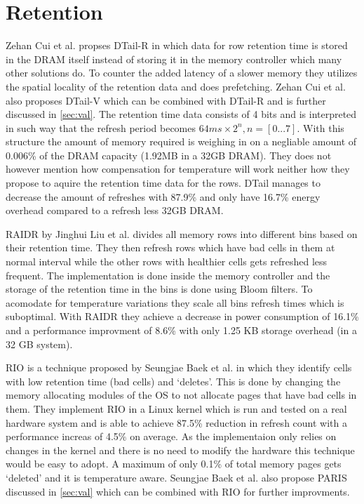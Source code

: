 \section{Retention}
\label{sec:ret}

Zehan Cui et al. \cite{dtail} propses DTail-R in which data for row retention time is stored in the DRAM itself instead of storing it in the memory controller which many other solutions do. To counter the added latency of a slower memory they utilizes the spatial locality of the retention data and does prefetching. Zehan Cui et al. also proposes DTail-V which can be combined with DTail-R and is further discussed in \ref{sec:val}. The retention time data consists of 4 bits and is interpreted in such way that the refresh period becomes \(64ms \times 2^n, n = [0...7]\). With this structure the amount of memory required is weighing in on a negliable amount of 0.006\% of the DRAM capacity (1.92MB in a 32GB DRAM). They does not however mention how compensation for temperature will work neither how they propose to aquire the retention time data for the rows. DTail manages to decrease the amount of refreshes with 87.9\% and only have 16.7\% energy overhead compared to a refresh less 32GB DRAM.

RAIDR by Jinghui Liu et al. \cite{raidr} divides all memory rows into different bins based on their retention time. They then refresh rows which have bad cells in them at normal interval while the other rows with healthier cells gets refreshed less frequent. The implementation is done inside the memory controller and the storage of the retention time in the bins is done using Bloom filters. To acomodate for temperature variations they scale all bins refresh times which is suboptimal. With RAIDR they achieve a decrease in power consumption of 16.1\% and a performance improvment of 8.6\% with only 1.25 KB storage overhead (in a 32 GB system).
  
RIO is a technique proposed by Seungjae Baek et al. \cite{rioparis} in which they identify cells with low retention time (bad cells) and `deletes'. This is done by changing the memory allocating modules of the OS to not allocate pages that have bad cells in them. They implement RIO in a Linux kernel which is run and tested on a real hardware system and is able to achieve 87.5\% reduction in refresh count with a performance increas of 4.5\% on average. As the implementaion only relies on changes in the kernel and there is no need to modify the hardware this technique would be easy to adopt. A maximum of only 0.1\% of total memory pages gets `deleted' and it is temperature aware. Seungjae Baek et al. also propose PARIS discussed in \ref{sec:val} which can be combined with RIO for further improvments.

